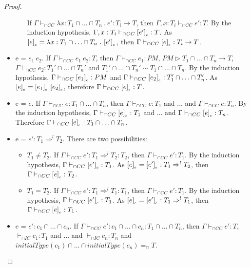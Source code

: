 \documentclass[a4paper]{article}
\begin{document}
\begin{proof}
\begin{itemize}
\begin{itemize}
        If $\Gamma \vdash_{\cap CC} \lambda x : T_1 \cap \ldots \cap T_n\ .\ e' : T_i \rightarrow T$, then $\Gamma, x : T_i \vdash_{\cap CC} e' : T$.
        By the induction hypothesis, $\Gamma, x : T_i \vdash_{\cap CC} [e']_{_e} : T$.
        As $\erasee{e} = \lambda x : T_1 \cap \ldots \cap T_n\ .\ \erasee{e'}$, then $\Gamma \vdash_{\cap CC} [e]_{_e} : T_i \rightarrow T$.
    \end{itemize}
    \item e = $e_1\ e_2$.
    If $\Gamma \vdash_{\cap CC} e_1\ e_2 : T$, then $\Gamma \vdash_{\cap CC} e_1 : PM$, $PM \rhd T_1 \cap \ldots \cap T_n \rightarrow T$, $\Gamma \vdash_{\cap CC} e_2 : T_1' \cap \ldots \cap T_n'$ and $T_1' \cap \ldots \cap T_n' \sim T_1 \cap \ldots \cap T_n$.
    By the induction hypothesis, $\Gamma \vdash_{\cap CC} [e_1]_{_e} : PM$ and $\Gamma \vdash_{\cap CC} [e_2]_{_e} : T_1' \cap \ldots \cap T_n'$.
    As $[e]_{_e} = [e_1]_{_e}\ [e_2]_{_e}$, therefore $\Gamma \vdash_{\cap CC} [e]_{_e} : T$.
    \item e = $e$.
    If $\Gamma \vdash_{\cap CC} e : T_1 \cap \ldots \cap T_n$, then $\Gamma \vdash_{\cap CC} e : T_1$ and ... and $\Gamma \vdash_{\cap CC} e : T_n$.
    By the induction hypothesis, $\Gamma \vdash_{\cap CC} [e]_{_e} : T_1$ and ... and $\Gamma \vdash_{\cap CC} [e]_{_e} : T_n$.
    Therefore $\Gamma \vdash_{\cap CC} [e]_{_e} : T_1 \cap \ldots \cap T_n$.
    \item e = $e' : T_1 \Rightarrow^l T_2$.
    There are two possibilities:
    \begin{itemize}
        \item $T_1 \neq T_2$.
        If $\Gamma \vdash_{\cap CC} e' : T_1 \Rightarrow^l T_2 : T_2$, then $\Gamma \vdash_{\cap CC} e' : T_1$.
        By the induction hypothesis, $\Gamma \vdash_{\cap CC} [e']_{_e} : T_1$.
        As $[e]_{_e} = [e']_{_e} : T_1 \Rightarrow^l T_2$, then $\Gamma \vdash_{\cap CC} [e]_{_e} : T_2$.
        \item $T_1 = T_2$.
        If $\Gamma \vdash_{\cap CC} e' : T_1 \Rightarrow^l T_1 : T_1$, then $\Gamma \vdash_{\cap CC} e' : T_1$.
        By the induction hypothesis, $\Gamma \vdash_{\cap CC} [e']_{_e} : T_1$.
        As $[e]_{_e} = [e']_{_e} : T_1 \Rightarrow^l T_1$, then $\Gamma \vdash_{\cap CC} [e]_{_e} : T_1$.
    \end{itemize}
    \item e = $e' : c_1 \cap \ldots \cap c_n$.
    If $\Gamma \vdash_{\cap CC} e' : c_1 \cap \ldots \cap c_n : T_1 \cap \ldots \cap T_n$, then $\Gamma \vdash_{\cap CC} e' : T$, $\vdash_{\cap IC} c_1 : T_1$ and ... and $\vdash_{\cap IC} c_n : T_n$ and $initialType(c_1) \cap \ldots \cap initialType(c_n) =_{\cap} T$.

\end{itemize}
\end{proof}
\end{document}
